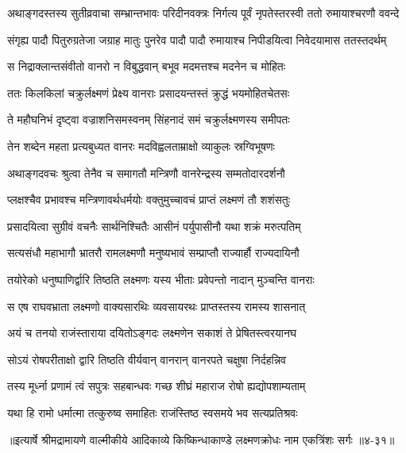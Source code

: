 \twolineshloka
{अथाङ्गदस्तस्य सुतीव्रवाचा सम्भ्रान्तभावः परिदीनवक्त्रः}
{निर्गत्य पूर्वं नृपतेस्तरस्वी ततो रुमायाश्चरणौ ववन्दे} %

\twolineshloka
{संगृह्य पादौ पितुरुग्रतेजा जग्राह मातुः पुनरेव पादौ}
{पादौ रुमायाश्च निपीडयित्वा निवेदयामास ततस्तदर्थम्} %

\twolineshloka
{स निद्राक्लान्तसंवीतो वानरो न विबुद्धवान्}
{बभूव मदमत्तश्च मदनेन च मोहितः} %

\twolineshloka
{ततः किलकिलां चक्रुर्लक्ष्मणं प्रेक्ष्य वानराः}
{प्रसादयन्तस्तं क्रुद्धं भयमोहितचेतसः} %

\twolineshloka
{ते महौघनिभं दृष्ट्वा वज्राशनिसमस्वनम्}
{सिंहनादं समं चक्रुर्लक्ष्मणस्य समीपतः} %

\twolineshloka
{तेन शब्देन महता प्रत्यबुध्यत वानरः}
{मदविह्वलताम्राक्षो व्याकुलः स्रग्विभूषणः} %

\twolineshloka
{अथाङ्गदवचः श्रुत्वा तेनैव च समागतौ}
{मन्त्रिणौ वानरेन्द्रस्य सम्मतोदारदर्शनौ} %

\twolineshloka
{प्लक्षश्चैव प्रभावश्च मन्त्रिणावर्थधर्मयोः}
{वक्तुमुच्चावचं प्राप्तं लक्ष्मणं तौ शशंसतुः} %

\twolineshloka
{प्रसादयित्वा सुग्रीवं वचनैः सार्थनिश्चितैः}
{आसीनं पर्युपासीनौ यथा शक्रं मरुत्पतिम्} %

\twolineshloka
{सत्यसंधौ महाभागौ भ्रातरौ रामलक्ष्मणौ}
{मनुष्यभावं सम्प्राप्तौ राज्यार्हौ राज्यदायिनौ} %

\twolineshloka
{तयोरेको धनुष्पाणिर्द्वारि तिष्ठति लक्ष्मणः}
{यस्य भीताः प्रवेपन्तो नादान् मुञ्चन्ति वानराः} %

\twolineshloka
{स एष राघवभ्राता लक्ष्मणो वाक्यसारथिः}
{व्यवसायरथः प्राप्तस्तस्य रामस्य शासनात्} %

\twolineshloka
{अयं च तनयो राजंस्ताराया दयितोऽङ्गदः}
{लक्ष्मणेन सकाशं ते प्रेषितस्त्वरयानघ} %

\twolineshloka
{सोऽयं रोषपरीताक्षो द्वारि तिष्ठति वीर्यवान्}
{वानरान् वानरपते चक्षुषा निर्दहन्निव} %

\twolineshloka
{तस्य मूर्ध्ना प्रणामं त्वं सपुत्रः सहबान्धवः}
{गच्छ शीघ्रं महाराज रोषो ह्यद्योपशाम्यताम्} %

\twolineshloka
{यथा हि रामो धर्मात्मा तत्कुरुष्व समाहितः}
{राजंस्तिष्ठ स्वसमये भव सत्यप्रतिश्रवः} %


॥इत्यार्षे श्रीमद्रामायणे वाल्मीकीये आदिकाव्ये किष्किन्धाकाण्डे लक्ष्मणक्रोधः नाम एकत्रिंशः सर्गः ॥४-३१॥
